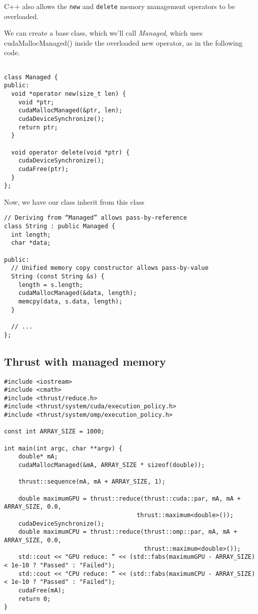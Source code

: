 C++ also allows the \verb!new! and \verb!delete! memory management operators to be overloaded.
 
We can create a base class, which we’ll call {\it Managed}, which uses
cudaMallocManaged() inside the overloaded new operator, as in the following
code.

\begin{lstlisting}

class Managed {
public:
  void *operator new(size_t len) {
    void *ptr;
    cudaMallocManaged(&ptr, len);
    cudaDeviceSynchronize();
    return ptr;
  }

  void operator delete(void *ptr) {
    cudaDeviceSynchronize();
    cudaFree(ptr);
  }
};
\end{lstlisting}

Now, we have our class inherit from this class

\begin{lstlisting}
// Deriving from “Managed” allows pass-by-reference
class String : public Managed {
  int length;
  char *data;

public:
  // Unified memory copy constructor allows pass-by-value
  String (const String &s) {
    length = s.length;
    cudaMallocManaged(&data, length);
    memcpy(data, s.data, length);
  }

  // ...
};
\end{lstlisting}
 

\subsection{Thrust with managed memory}
\label{sec:thrust-managed-memory}

\begin{lstlisting}
#include <iostream>
#include <cmath>
#include <thrust/reduce.h>
#include <thrust/system/cuda/execution_policy.h>
#include <thrust/system/omp/execution_policy.h>
 
const int ARRAY_SIZE = 1000;
 
int main(int argc, char **argv) {
    double* mA;
    cudaMallocManaged(&mA, ARRAY_SIZE * sizeof(double));
    
    thrust::sequence(mA, mA + ARRAY_SIZE, 1);
    
    double maximumGPU = thrust::reduce(thrust::cuda::par, mA, mA + ARRAY_SIZE, 0.0,      
                                     thrust::maximum<double>());
    cudaDeviceSynchronize();
    double maximumCPU = thrust::reduce(thrust::omp::par, mA, mA + ARRAY_SIZE, 0.0,    
                                       thrust::maximum<double>());
    std::cout << "GPU reduce: “ << (std::fabs(maximumGPU ‐ ARRAY_SIZE) < 1e‐10 ? "Passed" : "Failed");  
    std::cout << "CPU reduce: “ << (std::fabs(maximumCPU ‐ ARRAY_SIZE) < 1e‐10 ? "Passed" : "Failed"); 
    cudaFree(mA);
    return 0;
}
\end{lstlisting}

